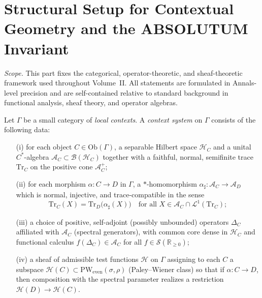 
\section{Structural Setup for Contextual Geometry and the ABSOLUTUM Invariant}
\label{sec:vol2-part1-structure}\relax\hspace{0pt} %

\noindent\emph{Scope.} This part fixes the categorical, operator-theoretic, and sheaf-theoretic framework used throughout Volume~II. All statements are formulated in Annals-level precision and are self-contained relative to standard background in functional analysis, sheaf theory, and operator algebras. \relax\hspace{0pt}


\begin{definition}\label{def:context-system}
Let $\Gamma$ be a small category of \emph{local contexts}. A \emph{context system} on $\Gamma$ consists of the following data:
\begin{enumerate}
  \item[(i)] for each object $C\in\mathrm{Ob}(\Gamma)$, a separable Hilbert space $\mathcal H_C$ and a unital $C^\ast$-algebra $\mathcal A_C\subset \mathcal B(\mathcal H_C)$ together with a faithful, normal, semifinite trace $\mathrm{Tr}_C$ on the positive cone $\mathcal A_C^+$;
  \item[(ii)] for each morphism $\alpha:C\to D$ in $\Gamma$, a $\ast$-homomorphism $\alpha_\sharp:\mathcal A_C\to\mathcal A_D$ which is normal, injective, and trace-compatible in the sense
  \[
  \mathrm{Tr}_C(X)=\mathrm{Tr}_D\big(\alpha_\sharp(X)\big)\quad\text{for all }X\in \mathcal A_C\cap \mathcal L^1(\mathrm{Tr}_C);
  \]
  \item[(iii)] a choice of positive, self-adjoint (possibly unbounded) operators $\Delta_C$ affiliated with $\mathcal A_C$ (spectral generators), with common core dense in $\mathcal H_C$ and functional calculus $f(\Delta_C)\in\mathcal A_C$ for all $f\in \mathcal S(\mathbb R_{\ge 0})$;
  \item[(iv)] a sheaf of admissible test functions $\mathscr H$ on $\Gamma$ assigning to each $C$ a subspace $\mathscr H(C)\subset \mathrm{PW}_{\mathrm{even}}(\sigma,\rho)$ (Paley–Wiener class) so that if $\alpha:C\to D$, then composition with the spectral parameter realizes a restriction $\mathscr H(D)\to\mathscr H(C)$.
\end{enumerate}
\end{definition}

